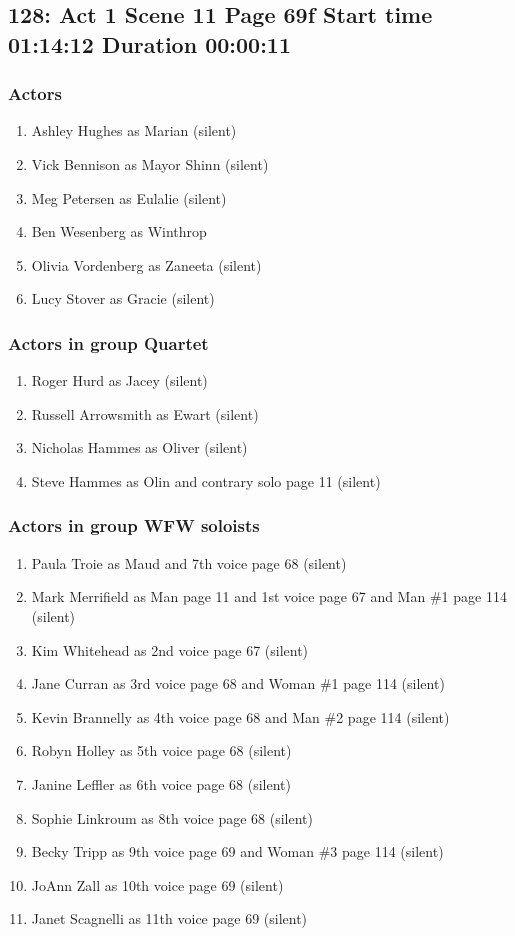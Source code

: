 \subsection{128: Act 1 Scene 11 Page 69f Start time 01:14:12 Duration 00:00:11}

\subsubsection{Actors}
\begin{enumerate}
\item Ashley Hughes as Marian (silent)
\item Vick Bennison as Mayor Shinn (silent)
\item Meg Petersen as Eulalie (silent)
\item Ben Wesenberg as Winthrop
\item Olivia Vordenberg as Zaneeta (silent)
\item Lucy Stover as Gracie (silent)
\end{enumerate}
\subsubsection{Actors in group Quartet}
\begin{enumerate}
\item Roger Hurd as Jacey (silent)
\item Russell Arrowsmith as Ewart (silent)
\item Nicholas Hammes as Oliver (silent)
\item Steve Hammes as Olin and contrary solo page 11 (silent)
\end{enumerate}
\subsubsection{Actors in group WFW soloists}
\begin{enumerate}
\item Paula Troie as Maud and 7th voice page 68 (silent)
\item Mark Merrifield as Man page 11 and 1st voice page 67 and Man \#1 page 114 (silent)
\item Kim Whitehead as 2nd voice page 67 (silent)
\item Jane Curran as 3rd voice page 68 and Woman \#1 page 114 (silent)
\item Kevin Brannelly as 4th voice page 68 and Man \#2 page 114 (silent)
\item Robyn Holley as 5th voice page 68 (silent)
\item Janine Leffler as 6th voice page 68 (silent)
\item Sophie Linkroum as 8th voice page 68 (silent)
\item Becky Tripp as 9th voice page 69 and Woman \#3 page 114 (silent)
\item JoAnn Zall as 10th voice page 69 (silent)
\item Janet Scagnelli as 11th voice page 69 (silent)
\end{enumerate}

